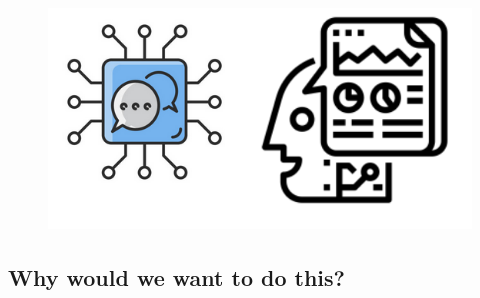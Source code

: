 \documentclass{book}
\begin{document}
\begin{figure}[h]
\includegraphics[scale = 0.4]{pics/lmdiagram.png}
\end{figure}



\subsection{Why would we want to do this?}
\end{document}
